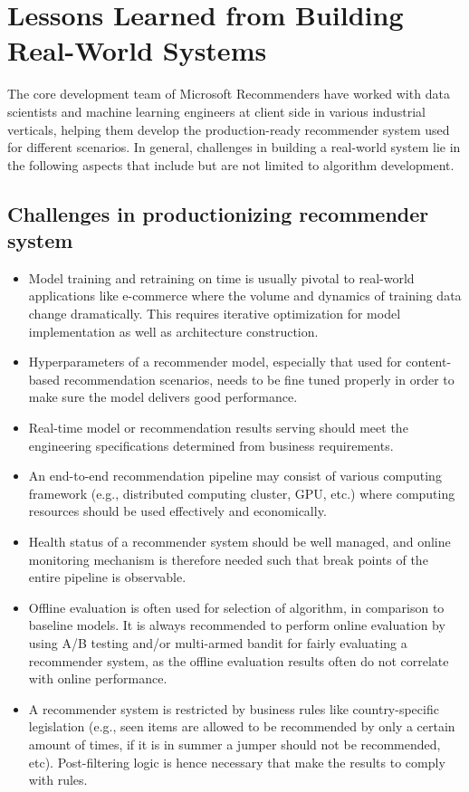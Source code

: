 \section{Lessons Learned from Building Real-World Systems} 

The core development team of Microsoft Recommenders have worked with data scientists and machine learning engineers at client side in various industrial verticals, helping them develop the production-ready recommender system used for different scenarios. In general, challenges in building a real-world system lie in the following aspects that include but are not limited to algorithm development.

\subsection{Challenges in productionizing recommender system}

\begin{itemize}
    \item Model training and retraining on time is usually pivotal to real-world applications like e-commerce where the volume and dynamics of training data change dramatically. This requires iterative optimization for model implementation as well as architecture construction.
    \item Hyperparameters of a recommender model, especially that used for content-based recommendation scenarios, needs to be fine tuned properly in order to make sure the model delivers good performance. 
    \item Real-time model or recommendation results serving should meet the engineering specifications determined from business requirements. 
    \item An end-to-end recommendation pipeline may consist of various computing framework (e.g., distributed computing cluster, GPU, etc.) where computing resources should be used effectively and economically. 
    \item Health status of a recommender system should be well managed, and online monitoring mechanism is therefore needed such that break points of the entire pipeline is observable.
    \item Offline evaluation is often used for selection of algorithm, in comparison to baseline models. It is always recommended to perform online evaluation by using A/B testing and/or multi-armed bandit for fairly evaluating a recommender system, as the offline evaluation results often do not correlate with online performance.
    \item A recommender system is restricted by business rules like country-specific legislation (e.g., seen items are allowed to be recommended by only a certain amount of times, if it is in summer a jumper should not be recommended, etc). Post-filtering logic is hence necessary that make the results to comply with rules.
\end{itemize}


